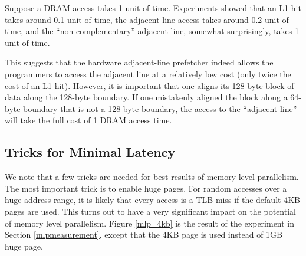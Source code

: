 \documentclass[11pt, usletter]{article}
\begin{document}
Suppose a DRAM access takes 1 unit of time. 
Experiments showed that an L1-hit takes around 0.1 unit of time, 
the adjacent line access takes around 0.2 unit of time, 
and the ``non-complementary'' adjacent line, somewhat surprisingly, takes 1 unit of time.

This suggests that the hardware adjacent-line prefetcher indeed allows 
the programmers to access the adjacent line at a relatively low cost (only twice the cost of an L1-hit). 
However, it is important that one aligns its 128-byte block of data along the 128-byte boundary. 
If one mistakenly aligned the block along a 64-byte boundary that is not a 128-byte boundary,
the access to the ``adjacent line'' will take the full cost of 1 DRAM access time. 

\subsection{Tricks for Minimal Latency} \label{misctricks}

We note that a few tricks are needed for best results of memory level parallelism. 
The most important trick is to enable huge pages. 
For random accesses over a huge address range, 
it is likely that every access is a TLB miss if the default 4KB pages are used. 
This turns out to have a very significant impact on the potential of memory level parallelism. 
Figure \ref{mlp_4kb} is the result of the experiment in Section \ref{mlpmeasurement}, 
except that the 4KB page is used instead of 1GB huge page. 
\end{document}
